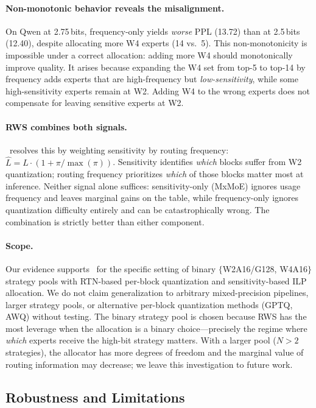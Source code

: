 \paragraph{Non-monotonic behavior reveals the misalignment.}
On Qwen at 2.75\,bits, frequency-only yields \emph{worse} PPL (13.72) than at 2.5\,bits (12.40), despite allocating more W4 experts (14 vs.\ 5). This non-monotonicity is impossible under a correct allocation: adding more W4 should monotonically improve quality. It arises because expanding the W4 set from top-5 to top-14 by frequency adds experts that are high-frequency but \emph{low-sensitivity}, while some high-sensitivity experts remain at W2. Adding W4 to the wrong experts does not compensate for leaving sensitive experts at W2.

\paragraph{RWS combines both signals.}
\method\ resolves this by weighting sensitivity by routing frequency: $\hat{L} = L \cdot (1 + \pi/\max(\pi))$. Sensitivity identifies \emph{which} blocks suffer from W2 quantization; routing frequency prioritizes \emph{which} of those blocks matter most at inference. Neither signal alone suffices: sensitivity-only (MxMoE) ignores usage frequency and leaves marginal gains on the table, while frequency-only ignores quantization difficulty entirely and can be catastrophically wrong. The combination is strictly better than either component.

\paragraph{Scope.}
Our evidence supports \method\ for the specific setting of binary $\{$W2A16/G128, W4A16$\}$ strategy pools with RTN-based per-block quantization and sensitivity-based ILP allocation. We do not claim generalization to arbitrary mixed-precision pipelines, larger strategy pools, or alternative per-block quantization methods (GPTQ, AWQ) without testing. The binary strategy pool is chosen because RWS has the most leverage when the allocation is a binary choice---precisely the regime where \emph{which} experts receive the high-bit strategy matters. With a larger pool ($N > 2$ strategies), the allocator has more degrees of freedom and the marginal value of routing information may decrease; we leave this investigation to future work.

\subsection{Robustness and Limitations}

